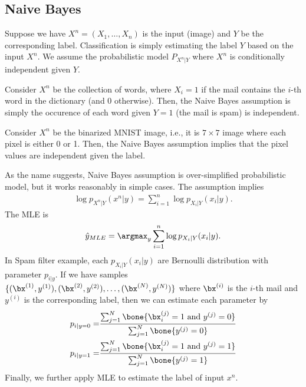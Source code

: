 \documentclass{article}
\begin{document}
\subsection{Naive Bayes}
Suppose we have $X^n = (X_1, \dots, X_n)$ is the input (image) and $Y$ be the corresponding label.
Classification is simply estimating the label $Y$ based on the input $X^n$.
We assume the probabilistic model $P_{X^n|Y}$ where $X^n$ is conditionally independent given $Y$.

\begin{example}
    Consider $X^n$ be the collection of words, where $X_i=1$ if the mail contains the $i$-th word in the dictionary (and 0 otherwise).
    Then, the Naive Bayes assumption is simply the occurence of each word given $Y=1$ (the mail is spam) is independent.
\end{example}

\begin{example}[MNIST]
    Consider $X^n$ be the binarized MNIST image, i.e., it is $7\times 7$ image where each pixel is either 0 or 1. 
    Then, the Naive Bayes assumption implies that the pixel values are independent given the label.
\end{example}

As the name suggests, Naive Bayes assumption is over-simplified probabilistic model, but it works reasonably in simple cases.
The assumption implies
\begin{align}
    \log p_{X^n|Y}(x^n|y) = \sum_{i=1}^n \log p_{X_i|Y}(x_i|y).
\end{align}
The MLE is
\begin{align}
    \hat{y}_{MLE} = \argmax_{y} \sum_{i=1}^n \log p_{X_i|Y}(x_i|y).
\end{align}
In Spam filter example, each $p_{X_i|Y}(x_i|y)$ are Bernoulli distribution with parameter $p_{i|y}$.
If we have samples $\{(\bx^{(1)}, y^{(1)}), (\bx^{(2)}, y^{(2)}), \dots, (\bx^{(N)}, y^{(N)})\}$ where $\bx^{(i)}$ is the $i$-th mail and $y^{(i)}$ is the corresponding label,
then we can estimate each parameter by
\begin{align}
    p_{i|y=0} =& \frac{\sum_{j=1}^N \bone\{\bx^{(j)}_i=1 \mbox{ and }y^{(j)}=0\}}{\sum_{j=1}^N \bone\{y^{(j)}=0\}}\\
    p_{i|y=1} =& \frac{\sum_{j=1}^N \bone\{\bx^{(j)}_i=1 \mbox{ and }y^{(j)}=1\}}{\sum_{j=1}^N \bone\{y^{(j)}=1\}}
\end{align}
Finally, we further apply MLE to estimate the label of input $x^n$.
\end{document}
